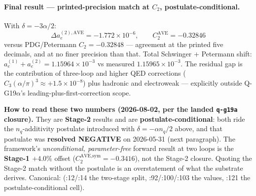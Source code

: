 \paragraph{Final result --- printed-precision match at $C_2$, postulate-conditional.} With
$\delta = -3\alpha/2$:
\begin{equation}
    \Delta a_e^{(2),\text{AVE}} = -1.772\times 10^{-6},\qquad
    C_2^{\text{AVE}} = -0.32846
\end{equation}
versus PDG/Petermann $C_2 = -0.32848$ --- agreement at the printed five decimals,
and at no finer precision than that. Total Schwinger + Petermann shift:
$a_e^{(1)} + a_e^{(2)} = 1.15964\times 10^{-3}$ vs measured
$1.15965\times 10^{-3}$. The residual
gap is the contribution of three-loop and higher QED corrections
($C_3(\alpha/\pi)^3 \approx +1.5\times 10^{-8}$) plus hadronic and
electroweak --- explicitly outside Q-G19$\alpha$'s
leading-plus-first-correction scope.

\noindent\textbf{How to read these two numbers (2026-08-02, per the landed \texttt{q-g19a}
closure).} They are \textbf{Stage-2} results and are \textbf{postulate-conditional}: both ride the
$n_q$-additivity postulate introduced with $\delta = -\alpha n_q/2$ above, and that postulate was
\textbf{resolved NEGATIVE} on 2026-05-31 (next paragraph). The framework's \emph{unconditional,
parameter-free} forward result at two loops is the \textbf{Stage-1 $+4.0\%$} offset
($C_2^{\text{AVE,sym}} = -0.3416$), not the Stage-2 closure. Quoting the Stage-2 match without the
postulate is an overstatement of what the substrate derives. Canonical:
(:12/:14 the two-stage split, :92/:100/:103 the values, :121 the postulate-conditional cell).


